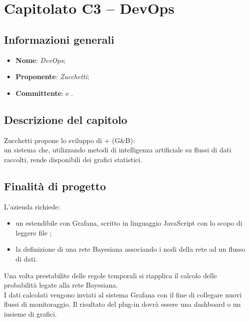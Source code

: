 \section{Capitolato C3 – DevOps}

\subsection{Informazioni generali}
% 
\begin{itemize}
\item \textbf{Nome}: \textit{DevOps};\phantom{.}
\item \textbf{Proponente}: \textit{Zucchetti};\phantom{.}
\item \textbf{Committente}: \commitNameM\mbox{} e \commitNameS.
\end{itemize}

\subsection{Descrizione del capitolo}
Zucchetti propone lo sviluppo di + (G\&B):\\
 un sistema che, utilizzando metodi di intelligenza artificiale su flussi di dati raccolti, rende disponibili dei grafici statistici.

\subsection{Finalità di progetto}
L'azienda richiede:
\begin{itemize}
    \item un  estendibile con Grafana, scritto in linguaggio JavaScript con lo scopo di leggere file ;
    \item la definizione di una rete Bayesiana associando i nodi della rete ad un flusso di dati. 
\end{itemize}
Una volta prestabilite delle regole temporali si riapplica il calcolo delle probabilità legate alla rete Bayesiana.
\\
I dati calcolati vengono inviati al sistema Grafana con il fine di collegare nuovi flussi di monitoraggio.
Il risultato del plug-in dovrà essere una dashboard o un insieme di grafici.
